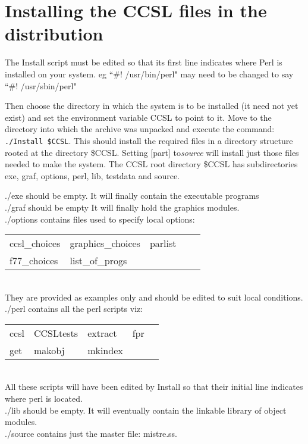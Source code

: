 \documentclass[onecolumn,twoside,11pt,a4paper]{report}
\begin{document}
\section{Installing the CCSL files in the distribution}
The Install script must be edited so that its first line indicates where Perl
is installed on your system. 
eg ``\#! /usr/bin/perl" may need to be changed to say ``\#! /usr/sbin/perl"\
\par
Then choose the directory in which the system is to be installed (it need not yet exist) and set the environment variable CCSL to point to it.
Move to the directory into which the archive was unpacked and execute the command:
\texttt{./Install \$CCSL}. This should install
the required files in a directory structure rooted at the directory
\$CCSL. Setting [part] to\emph{source} will install just those files needed to make the system. 
\p
The CCSL root directory \$CCSL 
has  subdirectories  exe, graf, options, perl, lib, testdata  and source.
\par
./exe should be empty. 
It will finally contain the executable programs
\\[0.5ex]
./graf should be empty
It will finally hold the graphics modules.
\\[0.5ex]
./options contains files used to specify local options:\\
\begin{tabular}{lllll}
ccsl\_choices\qquad&graphics\_choices\qquad&parlist\\               
f77\_choices\qquad&list\_of\_progs\\[0.5ex] 
\end{tabular}\\
They are provided as examples only and should be edited to suit local 
conditions.      
\\[0.5ex]
./perl contains all the perl scripts viz: \\
\begin{tabular}{lllll}
ccsl\qquad &CCSLtests\qquad&extract\qquad&fpr\\         
get\qquad&makobj\qquad&mkindex\\
\end{tabular}\\
All these scripts will have been edited by Install so that their initial
line indicates where perl is located.
\\[0.5ex]
./lib should be empty.  
It will eventually contain the linkable library of object modules.
\\[0.5ex]
./source contains just the master file: mistre.ss.\\ 
\end{document}
